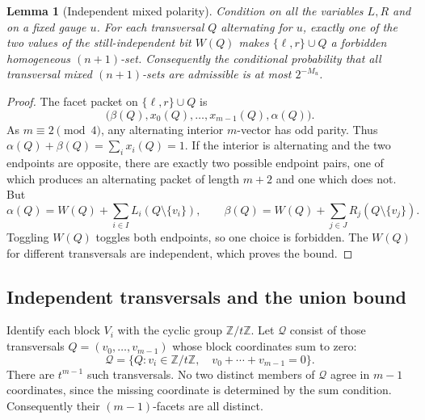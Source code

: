 \documentclass[11pt,a4paper]{article}
\newtheorem{lemma}[theorem]{Lemma}
\theoremstyle{remark}
\begin{document}
\begin{lemma}[Independent mixed polarity]\label{lem:p3-polarity}
Condition on all the variables $L,R$ and on a fixed gauge $u$.
For each transversal $Q$ alternating for $u$, exactly one of the two
values of the still-independent bit $W(Q)$ makes
$\{\ell,r\}\cup Q$ a forbidden homogeneous $(n+1)$-set.
Consequently the conditional probability that all transversal mixed
$(n+1)$-sets are admissible is at most $2^{-M_u}$.
\end{lemma}
\begin{proof}
The facet packet on $\{\ell,r\}\cup Q$ is
\[
 \bigl(\beta(Q),x_0(Q),\ldots,x_{m-1}(Q),\alpha(Q)\bigr).
\]
As $m\equiv2\pmod4$, any alternating interior $m$-vector has odd
parity. Thus $\alpha(Q)+\beta(Q)=\sum_i x_i(Q)=1$.
If the interior is alternating and the two endpoints are opposite,
there are exactly two possible endpoint pairs, one of which produces
an alternating packet of length $m+2$ and one which does not.
But
\[
 \alpha(Q)=W(Q)+\sum_{i\in I}L_i(Q\setminus\{v_i\}),
 \qquad
 \beta(Q)=W(Q)+\sum_{j\in J}R_j(Q\setminus\{v_j\}).
\]
Toggling $W(Q)$ toggles both endpoints, so one choice is forbidden.
The $W(Q)$ for different transversals are independent, which proves
the bound.
\end{proof}

\subsection{Independent transversals and the union bound}
Identify each block $V_i$ with the cyclic group $\mathbb Z/t\mathbb Z$.
Let $\mathcal Q$ consist of those transversals
$Q=(v_0,\ldots,v_{m-1})$ whose block coordinates sum to zero:
\[
 \mathcal Q=\{Q: v_i\in\mathbb Z/t\mathbb Z,\quad
                  v_0+\cdots+v_{m-1}=0\}.
\]
There are $t^{m-1}$ such transversals. No two distinct members
of $\mathcal Q$ agree in $m-1$ coordinates, since the missing coordinate
is determined by the sum condition. Consequently their
$(m-1)$-facets are all distinct.
\end{document}
